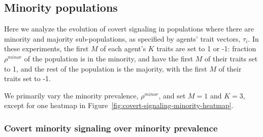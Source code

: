 \documentclass[11pt,letterpaper]{article}
\begin{document}
\subsection{Minority populations}

Here we analyze the evolution of covert signaling in populations where there
are minority and majority sub-populations, as specified by agents' trait
vectors, $\tau_i$. In these experiments, the first $M$ of each agent's $K$ traits
are set to 1 or -1: fraction $\rho^{minor}$ of the
population is in the minority, and have the first $M$ of their traits set to
1, and the rest of the population is the majority, with the first $M$ of their
traits set to -1. 

We primarily vary the minority prevalence, $\rho^{minor}$, and set $M=1$ and
$K=3$, except for one heatmap in 
Figure~\ref{fig:covert-signaling-minority-heatmap}. 

\subsubsection{Covert minority signaling over minority prevalence}
\end{document}
